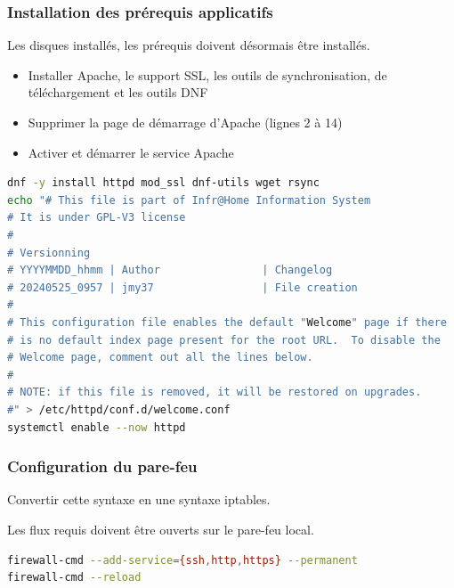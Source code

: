 \subsubsection{Installation des prérequis applicatifs}
Les disques installés, les prérequis doivent désormais être installés.\\

\begin{itemize}
    \item Installer Apache, le support SSL, les outils de synchronisation, de téléchargement et les outils DNF
    \item Supprimer la page de démarrage d'Apache (lignes 2 à 14)
    \item Activer et démarrer le service Apache
\end{itemize}

\begin{lstlisting}[language=bash, caption=Installation des prérequis applicatifs]
dnf -y install httpd mod_ssl dnf-utils wget rsync
echo "# This file is part of Infr@Home Information System
# It is under GPL-V3 license
#
# Versionning
# YYYYMMDD_hhmm | Author                | Changelog
# 20240525_0957 | jmy37                 | File creation
#
# This configuration file enables the default "Welcome" page if there
# is no default index page present for the root URL.  To disable the
# Welcome page, comment out all the lines below.
#
# NOTE: if this file is removed, it will be restored on upgrades.
#" > /etc/httpd/conf.d/welcome.conf
systemctl enable --now httpd
\end{lstlisting}

\subsubsection{Configuration du pare-feu}

\begin{important}
Convertir cette syntaxe en une syntaxe iptables.
\end{important}

Les flux requis doivent être ouverts sur le pare-feu local.

\begin{lstlisting}[language=bash, caption=Configuration du pare-feu local]
firewall-cmd --add-service={ssh,http,https} --permanent
firewall-cmd --reload
\end{lstlisting}